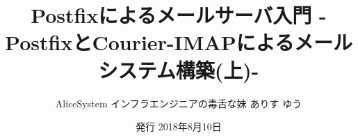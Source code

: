 \title{Postfixによるメールサーバ入門 -PostfixとCourier-IMAPによるメールシステム構築(上)-}
\author{AliceSystem インフラエンジニアの毒舌な妹 ありす ゆう}
\date{発行 2018年8月10日}
